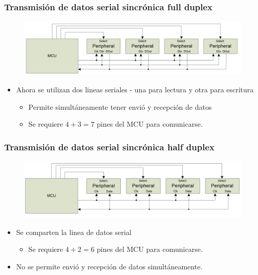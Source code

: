 \documentclass[10.5pt,scale=1.0,t,aspectratio=169,hyperref={pdfpagelabels=false}]{beamer}
\begin{document}
\begin{frame}
	\frametitle{Transmisión de datos serial sincrónica full duplex}
	
	\begin{figure}
		\centering
		\includegraphics[scale=0.4]{05_SyncSerialFullDuplex}
	\end{figure}
	
	\begin{itemize}
		\item Ahora se utilizan dos lineas seriales - una para lectura y otra para escritura
		\begin{itemize}
			\item Permite simultáneamente tener envió y recepción de datos 
			\item Se requiere $4+3=7$ pines del MCU para comunicarse. 
		\end{itemize}
	\end{itemize}
	
\end{frame}

\begin{frame}
	\frametitle{Transmisión de datos serial sincrónica half duplex}
	
	\begin{figure}
		\centering
		\includegraphics[scale=0.4]{06_SyncSerialHalfDuplex}
	\end{figure}
	
	\begin{itemize}
		\item Se comparten la linea de datos serial
		\begin{itemize}
			\item Se requiere $4+2=6$ pines del MCU para comunicarse. 
		\end{itemize}
		\item No se permite envió y recepción de datos simultáneamente. 
	\end{itemize}
	
\end{frame}
\end{document}
